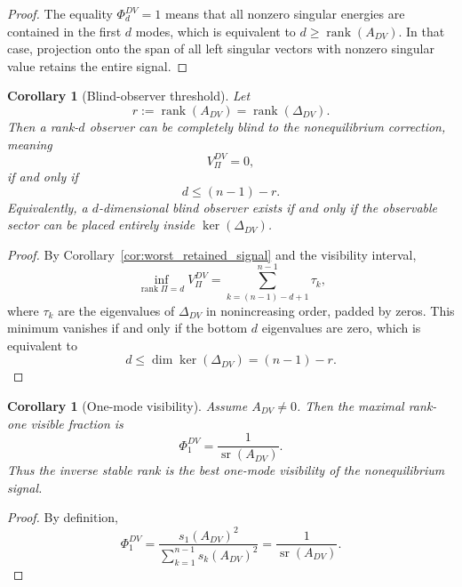 \documentclass[11pt,a4paper]{article}
\numberwithin{equation}{section}
\theoremstyle{thmcompact}
\newtheorem{corollary}[theorem]{Corollary}
\theoremstyle{remark}
\begin{document}
\begin{proof}
The equality \(\Phi_d^{DV}=1\) means that all nonzero singular energies are contained in the first \(d\) modes, which is equivalent to \(d\ge \operatorname{rank}(A_{DV})\). In that case, projection onto the span of all left singular vectors with nonzero singular value retains the entire signal.
\end{proof}


\begin{corollary}[Blind-observer threshold]
\label{cor:blind_observer_threshold}
Let
\begin{equation}
r:=\operatorname{rank}(A_{DV})=\operatorname{rank}(\Delta_{DV}).
\end{equation}
Then a rank-\(d\) observer can be completely blind to the nonequilibrium correction, meaning
\begin{equation}
V_\Pi^{DV}=0,
\end{equation}
if and only if
\begin{equation}
d\le (n-1)-r.
\end{equation}
Equivalently, a \(d\)-dimensional blind observer exists if and only if the observable sector can be placed entirely inside \(\ker(\Delta_{DV})\).
\end{corollary}

\begin{proof}
By Corollary~\ref{cor:worst_retained_signal} and the visibility interval,
\begin{equation}
\inf_{\operatorname{rank}\Pi=d}V_\Pi^{DV}
=
\sum_{k=(n-1)-d+1}^{n-1}\tau_k,
\end{equation}
where \(\tau_k\) are the eigenvalues of \(\Delta_{DV}\) in nonincreasing order, padded by zeros. This minimum vanishes if and only if the bottom \(d\) eigenvalues are zero, which is equivalent to
\begin{equation}
d\le \dim\ker(\Delta_{DV})=(n-1)-r.
\end{equation}
\end{proof}
\begin{corollary}[One-mode visibility]
\label{cor:one_mode_visibility}
Assume \(A_{DV}\neq 0\). Then the maximal rank-one visible fraction is
\begin{equation}
\Phi_1^{DV}
=
\frac{1}{\operatorname{sr}(A_{DV})}.
\end{equation}
Thus the inverse stable rank is the best one-mode visibility of the nonequilibrium signal.
\end{corollary}

\begin{proof}
By definition,
\begin{equation}
\Phi_1^{DV}
=
\frac{s_1(A_{DV})^2}{\sum_{k=1}^{n-1}s_k(A_{DV})^2}
=
\frac{1}{\operatorname{sr}(A_{DV})}.
\end{equation}
\end{proof}
\end{document}
